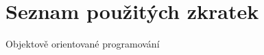 \usepackage[T1]{fontenc}
\usepackage[utf8]{inputenc}


\chapter{Seznam pou\v zit\'ych zkratek}

\begin{description}[align=left]
    \item [OOP] Objektově orientované programování
\end{description}
